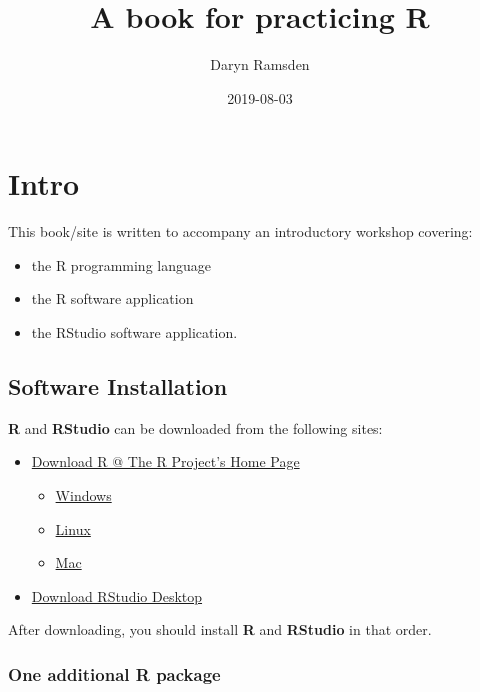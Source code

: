 \documentclass[]{book}
\title{A book for practicing R}
\author{Daryn Ramsden}
\date{2019-08-03}
\providecommand{\tightlist}{%
  \setlength{\itemsep}{0pt}\setlength{\parskip}{0pt}}
\begin{document}
\maketitle

{
\setcounter{tocdepth}{1}
\tableofcontents
}
\hypertarget{intro}{%
\chapter{Intro}\label{intro}}

This book/site is written to accompany an introductory workshop covering:

\begin{itemize}
\tightlist
\item
  the R programming language
\item
  the R software application
\item
  the RStudio software application.
\end{itemize}

\hypertarget{install}{%
\section*{Software Installation}\label{install}}

\textbf{R} and \textbf{RStudio} can be downloaded from the following sites:

\begin{itemize}
\tightlist
\item
  \href{https://cloud.r-project.org/}{Download R @ The R Project's Home Page}

  \begin{itemize}
  \tightlist
  \item
    \href{https://cloud.r-project.org/bin/windows/base/}{Windows}
  \item
    \href{https://cloud.r-project.org/bin/linux/}{Linux}
  \item
    \href{https://cloud.r-project.org/bin/macosx/}{Mac}
  \end{itemize}
\item
  \href{https://www.rstudio.com/products/rstudio/download/\#download}{Download RStudio Desktop}
\end{itemize}

After downloading, you should install \textbf{R} and \textbf{RStudio} in that order.

\hypertarget{notitia}{%
\subsection*{One additional R package}\label{notitia}}
\end{document}
